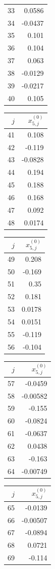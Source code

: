 {\begin{tabular}[t]{r|r}
33 & 0.0586 \\
34 & -0.0437 \\
35 & 0.101 \\
36 & 0.104 \\
37 & 0.063 \\
38 & -0.0129 \\
39 & -0.0217 \\
40 & 0.105
\end{tabular}\kern4pt
\begin{tabular}[t]{r|r}
$j$ & $x^{(0)}_{5,j}$ \\\hline
41 & 0.108 \\
42 & -0.119 \\
43 & -0.0828 \\
44 & 0.194 \\
45 & 0.188 \\
46 & 0.168 \\
47 & 0.092 \\
48 & 0.0174
\end{tabular}\kern4pt
\begin{tabular}[t]{r|r}
$j$ & $x^{(0)}_{5,j}$ \\\hline
49 & 0.208 \\
50 & -0.169 \\
51 & 0.35 \\
52 & 0.181 \\
53 & 0.0178 \\
54 & 0.0151 \\
55 & -0.119 \\
56 & -0.104
\end{tabular}\kern4pt
\begin{tabular}[t]{r|r}
$j$ & $x^{(0)}_{5,j}$ \\\hline
57 & -0.0459 \\
58 & -0.00582 \\
59 & -0.155 \\
60 & -0.0824 \\
61 & -0.0637 \\
62 & 0.0438 \\
63 & -0.163 \\
64 & -0.00749
\end{tabular}\kern4pt
\begin{tabular}[t]{r|r}
$j$ & $x^{(0)}_{5,j}$ \\\hline
65 & -0.0139 \\
66 & -0.00507 \\
67 & -0.0894 \\
68 & 0.0721 \\
69 & -0.114 \\

\end{tabular}}
